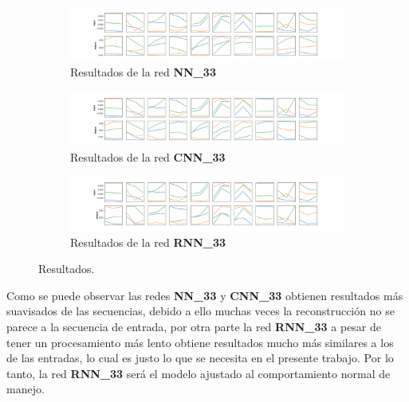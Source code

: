 \begin{figure}
        \centering
        \begin{subfigure}[h]{0.99\textwidth} 
            \includegraphics[width=\textwidth]{imagenes/Cap5/resultado_nn}
            \caption{Resultados de la red \textbf{NN\_33}}
            \label{fig:res_nn}
        \end{subfigure}       
        \begin{subfigure}[h]{0.99\textwidth} 
            \includegraphics[width=\textwidth]{imagenes/Cap5/resultado_cnn}
            \caption{Resultados de la red \textbf{CNN\_33}}
            \label{fig:res_cnn}
        \end{subfigure}
        
        \begin{subfigure}[h]{0.99\textwidth} 
            \includegraphics[width=\textwidth]{imagenes/Cap5/resultado_rnn}
            \caption{Resultados de la red \textbf{RNN\_33}}
            \label{fig:res_rnn}
        \end{subfigure}     
        \caption{Resultados.}
        
		\label{fig:res_autoencoders}
    \end{figure}


\vspace{5mm} %
Como se puede observar las redes \textbf{NN\_33} y \textbf{CNN\_33} obtienen resultados m\'{a}s suavisados de las secuencias, debido a ello muchas veces la reconstrucci\'{o}n no se parece a la secuencia de entrada, por otra parte la red \textbf{RNN\_33} a pesar de tener un procesamiento m\'{a}s lento obtiene resultados mucho m\'{a}s similares a los de las entradas, lo cual es justo lo que se necesita en el presente trabajo. Por lo tanto, la red \textbf{RNN\_33} ser\'{a} el modelo ajustado al comportamiento normal de manejo.

